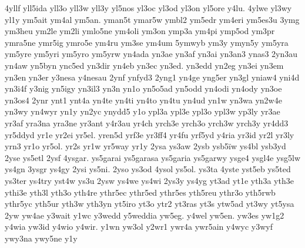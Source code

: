 {4yllf
yll5ida
yll3o
yll3w
yll3y
yl5nos
yl3oc
yl3od
yl3on
yl5ore
y4lu.
4ylwe
yl3wy
yl1y
ym5ait
ym4al
ym5an.
yman5t
ymar5w
ymbl2
ym5edr
ym4eri
ym5es3u
3ymg
ym3heu
ym2le
ym2li
ymlo5ne
ym4oli
ym3on
ymp3a
ym4pi
ymp5od
ym3pr
ymra5ne
ymr5ig
ymro5e
ym4ru
ym3se
ym4um
5ymwyb
ym3y
ymyn5y
ym5yra
ym5yre
ym5yri
ym5yro
ym5yrw
yn4ada
yn3ae
yn3af
yn3ai
yn3an3
ynas3
2yn3au
yn4aw
yn5byn
ync5ed
yn3dir
yn4eb
yn3ec
yn3ed.
yn3edd
yn2eg
yn3ei
yn3em
yn3en
yn3er
y3nesa
y4nesau
2ynf
ynfyd3
2yng1
yn4ge
yng5er
yn3gl
yniaw4
yni4d
yn3i4f
y3nig
yn5igy
yn3il3
yn3n
yn1o
yn5o5ad
yn5odd
yn4odi
yn4ody
yn3oe
yn3os4
2ynr
ynt1
ynt4a
yn4te
yn4ti
yn4to
yn4tu
yn4ud
yn1w
yn3wa
yn2w4e
yn3wy
yn4wyr
yn1y
yn2yc
ynydd5
y1o
ypl3a
ypl3e
ypl3o
ypl3w
yp3ly
yr3ae
yr3af
yra3na
yra3ne
yr3ant
y4r3au
yr4ch
yrch3e
yrch3o
yrch3w
yrch3y
yr4dd3
yr5ddyd
yr1e
yr2ei
yr5el.
yren5d
yrf3e
yr3ff4
yr4fu
yrf5yd
y4ria
yr3id
yr2l
yr3ly
yrn3
yr1o
yr5ol.
yr2s
yr1w
yr5way
yr1y
2ysa
ys3aw
2ysb
ysb5ïw
ys4bl
ysb3yd
2yse
ys5etl
2ysf
4ysgar.
ys5garai
ys5garasa
ys5garia
ys5garwy
ysge4
ysgl4e
ysg5lw
ys4gn
3ysgr
ys4gy
2ysi
ys5ni.
2yso
ys3od
4ysol
ys5ol.
ys3ta
4yste
yst5eb
ys5ted
ys3ter
ys4try
yst4w
ys3u
2ysw
ys4we
ys4wi
2ys3y
ys4yg
yt3ad
yt1e
yth3a
yth3e
ythi3e
yth3l
yth3o
yth4re
ythr5ec
ythr5ed
ythr5es
yth5reu
ythr3o
yth5rwb
ythr5yc
yth5ur
yth3w
yth3yn
yt5iro
yt3o
ytr2
yt3ras
yt3s
ytw5ad
yt3wy
yt5ysa
2yw
yw4ae
y3wait
y1wc
y3wedd
y5weddia
yw5eg.
y4wel
yw5en.
yw3es
yw1g2
y4wia
yw3id
y4wio
y4wir.
y1wn
yw3ol
y2wr1
ywr4a
ywr5ain
y4wyc
y3wyf
ywy3na
ywy5ne
y1y
}
\endinput
